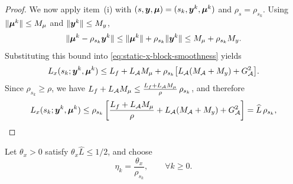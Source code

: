 \begin{proof}
We now apply item~{\rm (i)} with
$(s,\bm{y},\bm{\mu})=(s_k,\bm{y}^k,\bm{\mu}^k)$ and $\rho_s=\rho_{s_k}$.
Using $\|\bm{\mu}^k\|\le M_\mu$ and $\|\bm{y}^k\|\le M_y$,
\[
    \|\bm{\mu}^k-\rho_{s_k}\bm{y}^k\|
    \le
    \|\bm{\mu}^k\|+\rho_{s_k}\|\bm{y}^k\|
    \le
    M_\mu+\rho_{s_k} M_y.
\]
Substituting this bound into \eqref{eq:static-x-block-smoothness} yields
\[
    L_x(s_k;\bm{y}^k,\bm{\mu}^k)
    \le
    L_f+L_{\mathcal{A}}M_\mu
    +\rho_{s_k}\bigl[L_{\mathcal{A}}(M_{\mathcal{A}}+M_y)+G_{\mathcal{A}}^2\bigr].
\]
Since $\rho_{s_k}\ge\rho$, we have
$L_f+L_{\mathcal{A}}M_\mu\le\frac{L_f+L_{\mathcal{A}}M_\mu}{\rho}\,\rho_{s_k}$, and therefore
\[
    L_x(s_k;\bm{y}^k,\bm{\mu}^k)
    \le
    \rho_{s_k}
    \left[
    \frac{L_f+L_{\mathcal{A}}M_\mu}{\rho}
    +L_{\mathcal{A}}(M_{\mathcal{A}}+M_y)
    +G_{\mathcal{A}}^2
    \right]
    =
    \widehat L\,\rho_{s_k},
\]
\end{proof}



Let $\theta_x>0$ satisfy
$\theta_x\widehat L\le 1/2$, and choose
\begin{equation}
    \eta_k=\frac{\theta_x}{\rho_{s_k}},
    \qquad \forall k\ge0.
    \label{eq:explicit-primal-stepsize-coupling}
\end{equation}

